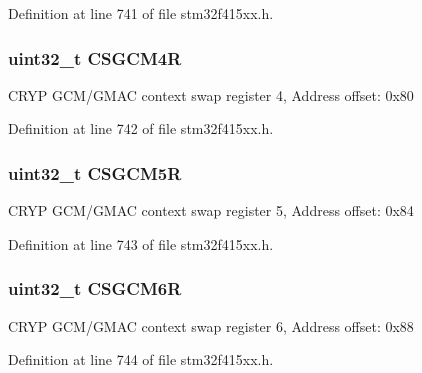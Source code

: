 Definition at line 741 of file stm32f415xx.\+h.

\subsubsection[{\texorpdfstring{C\+S\+G\+C\+M4R}{CSGCM4R}}]{ uint32\+\_\+t C\+S\+G\+C\+M4R}\hypertarget{struct_c_r_y_p___type_def_a63fc99181cf78d1f43270e79bcf787b5}{}\label{struct_c_r_y_p___type_def_a63fc99181cf78d1f43270e79bcf787b5}
C\+R\+YP G\+C\+M/\+G\+M\+AC context swap register 4, Address offset\+: 0x80 

Definition at line 742 of file stm32f415xx.\+h.

\subsubsection[{\texorpdfstring{C\+S\+G\+C\+M5R}{CSGCM5R}}]{ uint32\+\_\+t C\+S\+G\+C\+M5R}\hypertarget{struct_c_r_y_p___type_def_a470c323c7caa5d4362656cb0c8aa4528}{}\label{struct_c_r_y_p___type_def_a470c323c7caa5d4362656cb0c8aa4528}
C\+R\+YP G\+C\+M/\+G\+M\+AC context swap register 5, Address offset\+: 0x84 

Definition at line 743 of file stm32f415xx.\+h.

\subsubsection[{\texorpdfstring{C\+S\+G\+C\+M6R}{CSGCM6R}}]{ uint32\+\_\+t C\+S\+G\+C\+M6R}\hypertarget{struct_c_r_y_p___type_def_a8c2f4a1d321b61dc3b7833d209eb0ede}{}\label{struct_c_r_y_p___type_def_a8c2f4a1d321b61dc3b7833d209eb0ede}
C\+R\+YP G\+C\+M/\+G\+M\+AC context swap register 6, Address offset\+: 0x88 

Definition at line 744 of file stm32f415xx.\+h.

